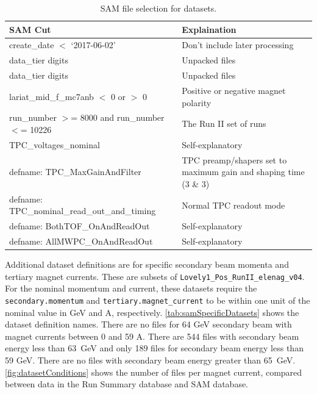 \documentclass[letterpaper,12pt]{article}
\begin{document}
\begin{table}[!hbtp]
  \begin{center}
    \caption{SAM file selection for datasets.}
    \label{tab:samDatasetProps}
    \small
    \begin{tabu}{|p{2.5in}|p{2.4in}|} \hline
      SAM Cut & Explaination \\ \hline \hline
      create\_date $<$ `2017-06-02' & Don't include later processing \\ \hline
      data\_tier digits & Unpacked files \\ \hline
      data\_tier digits & Unpacked files \\ \hline
      lariat\_mid\_f\_mc7anb $<$ 0 or $>$ 0 & Positive or negative magnet polarity \\ \hline
      run\_number $>$= 8000 and run\_number $<$= 10226 & The Run II set of runs \\ \hline
      TPC\_voltages\_nominal & Self-explanatory \\ \hline
      defname: TPC\_MaxGainAndFilter & TPC preamp/shapers set to maximum gain and shaping time (3 \& 3)\\ \hline
      defname: TPC\_nominal\_read\_out\_and\_timing & Normal TPC readout mode \\ \hline
      defname: BothTOF\_OnAndReadOut & Self-explanatory \\ \hline
      defname: AllMWPC\_OnAndReadOut & Self-explanatory \\ \hline
    \end{tabu}
  \end{center}
\end{table}

Additional dataset definitions are for specific secondary beam momenta and
tertiary magnet currents. These are subsets of
\texttt{Lovely1\_Pos\_RunII\_elenag\_v04}. For the nominal momentum and
current, these datasets require the \texttt{secondary.momentum} and
\texttt{tertiary.magnet\_current} to be within one unit of the nominal value in
GeV and A, respectively. \cref{tab:samSpecificDatasets} shows the dataset
definition names. There are no files for 64 GeV secondary beam with magnet
currents between 0 and 59 A. There are 544 files with secondary beam energy
less than 63~GeV and only 189 files for secondary beam energy less than 59 GeV.
There are no files with secondary beam energy greater than 65~GeV.
\cref{fig:datasetConditions} shows the number of files per magnet current,
compared between data in the Run Summary database and SAM database.
\end{document}
